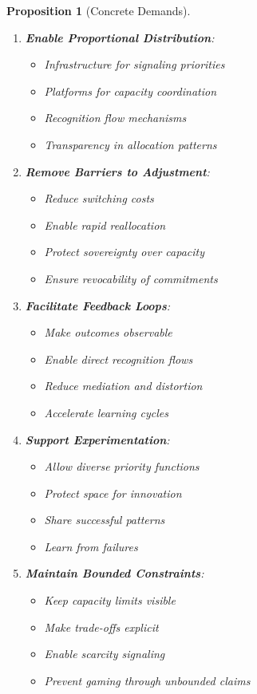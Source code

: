 \documentclass[11pt]{article}
\newtheorem{proposition}{Proposition}
\begin{document}
\begin{proposition}[Concrete Demands]
\begin{enumerate}
\item \textbf{Enable Proportional Distribution}:
\begin{itemize}
\item Infrastructure for signaling priorities
\item Platforms for capacity coordination
\item Recognition flow mechanisms
\item Transparency in allocation patterns
\end{itemize}

\item \textbf{Remove Barriers to Adjustment}:
\begin{itemize}
\item Reduce switching costs
\item Enable rapid reallocation
\item Protect sovereignty over capacity
\item Ensure revocability of commitments
\end{itemize}

\item \textbf{Facilitate Feedback Loops}:
\begin{itemize}
\item Make outcomes observable
\item Enable direct recognition flows
\item Reduce mediation and distortion
\item Accelerate learning cycles
\end{itemize}

\item \textbf{Support Experimentation}:
\begin{itemize}
\item Allow diverse priority functions
\item Protect space for innovation
\item Share successful patterns
\item Learn from failures
\end{itemize}

\item \textbf{Maintain Bounded Constraints}:
\begin{itemize}
\item Keep capacity limits visible
\item Make trade-offs explicit
\item Enable scarcity signaling
\item Prevent gaming through unbounded claims
\end{itemize}
\end{enumerate}
\end{proposition}
\end{document}
